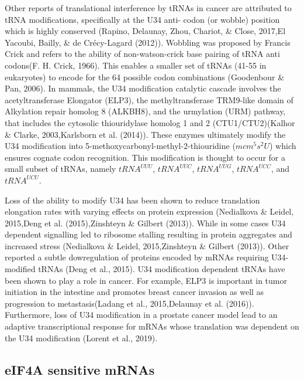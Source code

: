 \documentclass[12pt,openany]{book}
\begin{document}
Other reports of translational interference by tRNAs in cancer are
attributed to tRNA modifications, specifically at the U34 anti- codon
(or wobble) position which is highly conserved (Rapino, Delaunay, Zhou,
Chariot, \& Close, 2017,El Yacoubi, Bailly, \& de Crécy-Lagard (2012)).
Wobbling was proposed by Francis Crick and refers to the ability of
non-watson-crick base pairing of tRNA anti codons(F. H. Crick, 1966).
This enables a smaller set of tRNAs (41-55 in eukaryotes) to encode for
the 64 possible codon combinations (Goodenbour \& Pan, 2006). In
mammals, the U34 modification catalytic cascade involves the
acetyltransferase Elongator (ELP3), the methyltransferase TRM9-like
domain of Alkylation repair homolog 8 (ALKBH8), and the urmylation (URM)
pathway, that includes the cytosolic thiouridylase homolog 1 and 2
(CTU1/CTU2)(Kalhor \& Clarke, 2003,Karlsborn et al. (2014)). These
enzymes ultimately modify the U34 modification into
5-methoxycarbonyl-methyl-2-thiouridine (\(mcm^5s^2U\)) which ensures
cognate codon recognition. This modification is thought to occur for a
small subset of tRNAs, namely \(tRNA^{UUU}\), \(tRNA^{UUC}\),
\(tRNA^{UUG}\), \(tRNA^{UCC}\), and \(tRNA^{UCU}\).

Loss of the ability to modify U34 has been shown to reduce translation
elongation rates with varying effects on protein expression (Nedialkova
\& Leidel, 2015,Deng et al. (2015),Zinshteyn \& Gilbert (2013)). While
in some cases U34 dependent signalling led to ribosome stalling
resulting in protein aggregates and increased stress (Nedialkova \&
Leidel, 2015,Zinshteyn \& Gilbert (2013)). Other reported a subtle
dowregulation of proteins encoded by mRNAs requiring U34-modified tRNAs
(Deng et al., 2015). U34 modification dependent tRNAs have been shown to
play a role in cancer. For example, ELP3 is important in tumor
initiation in the intestine and promotes breast cancer invasion as well
as progression to metastasis(Ladang et al., 2015,Delaunay et al.
(2016)). Furthermore, loss of U34 modification in a prostate cancer
model lead to an adaptive transcriptional response for mRNAs whose
translation was dependent on the U34 modification (Lorent et al., 2019).

\subsection{eIF4A sensitive mRNAs} \label{eif4a}
\end{document}
